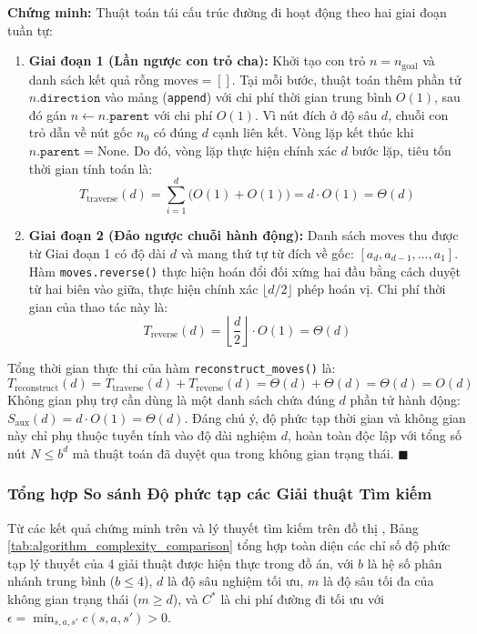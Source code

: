 \noindent
\textbf{Chứng minh:}
Thuật toán tái cấu trúc đường đi hoạt động theo hai giai đoạn tuần tự:
\begin{enumerate}[1.]
    \item \textbf{Giai đoạn 1 (Lần ngược con trỏ cha):}
    Khởi tạo con trỏ $n = n_{\text{goal}}$ và danh sách kết quả rỗng $\text{moves} = []$.
    Tại mỗi bước, thuật toán thêm phần tử $n.\texttt{direction}$ vào mảng (\texttt{append}) với chi phí thời gian
    trung bình $O(1)$, sau đó gán $n \leftarrow n.\texttt{parent}$ với chi phí $O(1)$.
    Vì nút đích ở độ sâu $d$, chuỗi con trỏ dẫn về nút gốc $n_0$ có đúng $d$ cạnh liên kết.
    Vòng lặp kết thúc khi $n.\texttt{parent} = \text{None}$.
    Do đó, vòng lặp thực hiện chính xác $d$ bước lặp, tiêu tốn thời gian tính toán là:
    \begin{equation}
        T_{\text{traverse}}(d) = \sum_{i=1}^{d} \Big( O(1) + O(1) \Big) = d \cdot O(1) = \Theta(d)
    \end{equation}

    \item \textbf{Giai đoạn 2 (Đảo ngược chuỗi hành động):}
    Danh sách $\text{moves}$ thu được từ Giai đoạn 1 có độ dài $d$ và mang thứ tự từ đích về gốc:
    $[a_d, a_{d-1}, \dots, a_1]$. Hàm \texttt{moves.reverse()} thực hiện hoán đổi đối xứng hai đầu
    bằng cách duyệt từ hai biên vào giữa, thực hiện chính xác $\lfloor d/2 \rfloor$ phép hoán vị.
    Chi phí thời gian của thao tác này là:
    \begin{equation}
        T_{\text{reverse}}(d) = \left\lfloor \frac{d}{2} \right\rfloor \cdot O(1) = \Theta(d)
    \end{equation}
\end{enumerate}
Tổng thời gian thực thi của hàm \texttt{reconstruct\_moves()} là:
\begin{equation}
    T_{\text{reconstruct}}(d) = T_{\text{traverse}}(d) + T_{\text{reverse}}(d) = \Theta(d) + \Theta(d) = \Theta(d) = O(d)
\end{equation}
Không gian phụ trợ cần dùng là một danh sách chứa đúng $d$ phần tử hành động:
$S_{\text{aux}}(d) = d \cdot O(1) = \Theta(d)$.
Đáng chú ý, độ phức tạp thời gian và không gian này chỉ phụ thuộc tuyến tính vào độ dài nghiệm $d$,
hoàn toàn độc lập với tổng số nút $N \le b^d$ mà thuật toán đã duyệt qua trong không gian trạng thái. \hfill $\blacksquare$

\subsubsection{Tổng hợp So sánh Độ phức tạp các Giải thuật Tìm kiếm}
Từ các kết quả chứng minh trên và lý thuyết tìm kiếm trên đồ thị \cite{russell2020aima},
Bảng \ref{tab:algorithm_complexity_comparison} tổng hợp toàn diện các chỉ số độ phức tạp lý thuyết
của 4 giải thuật được hiện thực trong đồ án, với $b$ là hệ số phân nhánh trung bình ($b \le 4$),
$d$ là độ sâu nghiệm tối ưu, $m$ là độ sâu tối đa của không gian trạng thái ($m \ge d$), và
$C^*$ là chi phí đường đi tối ưu với $\epsilon = \min_{s, a, s'} c(s, a, s') > 0$.

